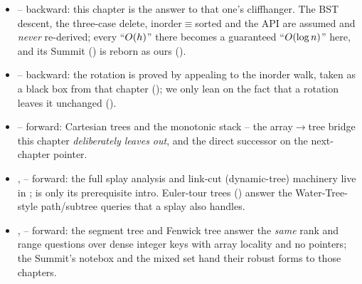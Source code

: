 
\begin{itemize}[nosep, leftmargin=1.4em]
  \item {} -- backward: this chapter is the answer to that one's cliffhanger. The BST descent, the
        three-case delete, inorder$\equiv$sorted and the  API are assumed and \emph{never}
        re-derived; every ``$O(h)$'' there becomes a guaranteed ``$O(\log n)$'' here, and its Summit
        () is reborn as ours ().
  \item {} -- backward: the rotation is proved by appealing to the inorder walk, taken as a black
        box from that chapter (); we only lean on the fact that a rotation leaves it
        unchanged ().
  \item {} -- forward: Cartesian trees and the monotonic stack -- the array$\to$tree bridge this
        chapter \emph{deliberately leaves out}, and the direct successor on the next-chapter pointer.
  \item {},  -- forward: the full splay analysis and link-cut (dynamic-tree) machinery
        live in ;  is only its prerequisite intro. Euler-tour trees
        () answer the Water-Tree-style path/subtree queries that a splay also handles.
  \item {},  -- forward: the segment tree and Fenwick tree answer the \emph{same} rank
        and range questions over dense integer keys with array locality and no pointers; the Summit's notebox
        and the mixed set hand their robust forms to those chapters.
\end{itemize}

